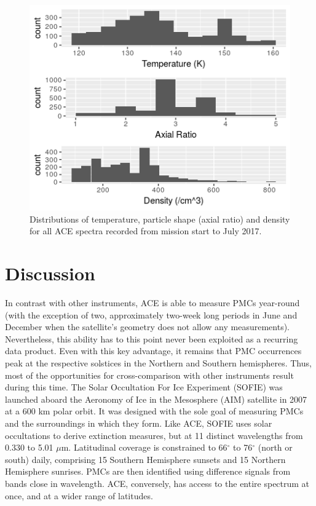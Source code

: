 \documentclass[]{elsarticle}
\begin{document}
\begin{figure}
	\includegraphics{figs/allHistograms}
	\caption{Distributions of temperature, particle shape (axial ratio) and density for all ACE spectra recorded from mission start to July 2017.}
	\label{fig:Fig3}
\end{figure}


\section{Discussion} \label{sec:disc}
In contrast with other instruments, ACE is able to measure PMCs year-round (with the exception of two, approximately two-week long periods in June and December when the satellite's geometry does not allow any measurements). Nevertheless, this ability has to this point never been exploited as a recurring data product. Even with this key advantage, it remains that PMC occurrences peak at the respective solstices in the Northern and Southern hemispheres. Thus, most of the opportunities for cross-comparison with other instruments result during this time. 
The Solar Occultation For Ice Experiment (SOFIE) was launched aboard the Aeronomy of Ice in the Mesosphere (AIM) satellite in 2007 at a 600 km polar orbit. It was designed with the sole goal of measuring PMCs and the surroundings in which they form. Like ACE, SOFIE uses solar occultations to derive extinction measures, but at 11 distinct wavelengths from 0.330 to 5.01 $\mu$m. Latitudinal coverage is constrained to 66$^{\circ}$ to 76$^{\circ}$ (north or south) daily, comprising 15 Southern Hemisphere sunsets and 15 Northern Hemisphere sunrises. PMCs are then identified using difference signals from bands close in wavelength. ACE, conversely, has access to the entire spectrum at once, and at a wider range of latitudes. 
\end{document}
